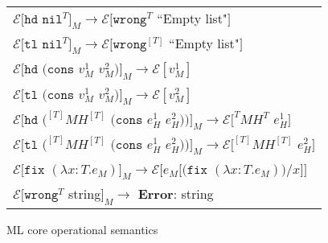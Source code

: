 \begin{figure}[p]
\begin{tabular}{l}
\vspace{5pt}

$\mathscr{E}[\mathtt{hd}$ $\mathtt{nil}^{T}]_{M}\rightarrow\mathscr{E}[\mathtt{wrong}^{T}$ ``Empty list"$]$ \\

\vspace{5pt}

$\mathscr{E}[\mathtt{tl}$ $\mathtt{nil}^{T}]_{M}\rightarrow\mathscr{E}[\mathtt{wrong}^{[T]}$ ``Empty list"$]$ \\

\vspace{5pt}

$\mathscr{E}[\mathtt{hd}$ $(\mathtt{cons}$ $v_{M}^{1}$ $v_{M}^{2})]_{M}\rightarrow\mathscr{E}[v_{M}^{1}]$ \\

\vspace{5pt}

$\mathscr{E}[\mathtt{tl}$ $(\mathtt{cons}$ $v_{M}^{1}$ $v_{M}^{2})]_{M}\rightarrow\mathscr{E}[v_{M}^{2}]$ \\

\vspace{5pt}

$\mathscr{E}[\mathtt{hd}$ $(^{[T]}MH^{[T]}$ $(\mathtt{cons}$ $e_{H}^{1}$ $e_{H}^{2}))]_{M}\rightarrow\mathscr{E}[^{T}MH^{T}$ $e_{H}^{1}]$ \\

\vspace{5pt}

$\mathscr{E}[\mathtt{tl}$ $(^{[T]}MH^{[T]}$ $(\mathtt{cons}$ $e_{H}^{1}$ $e_{H}^{2}))]_{M}\rightarrow\mathscr{E}[^{[T]}MH^{[T]}$ $e_{H}^{2}]$ \\

\vspace{5pt}

$\mathscr{E}[\mathtt{fix}$ $(\lambda x:T.e_{M})]_{M}\rightarrow\mathscr{E}[e_{M}[(\mathtt{fix}$ $(\lambda x:T.e_{M}))/x]]$ \\

\vspace{5pt}

$\mathscr{E}[\mathtt{wrong}^{T}$ string$]_{M}\rightarrow$ \textbf{Error}: string 
\end{tabular}
\caption{ML core operational semantics}
\label{cmos}
\end{figure}